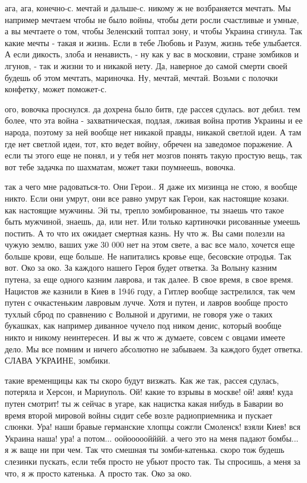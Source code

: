 ага, ага, конечно-с. мечтай и дальше-с. никому ж не возбраняется мечтать. Мы
например мечтаем чтобы не было войны, чтобы дети росли счастливые и умные, а вы
мечтаете о том, чтобы Зеленский топтал зону, и чтобы Украина сгинула. Так какие
мечты - такая и жизнь. Если в тебе Любовь и Разум, жизнь тебе улыбается. А если
дикость, злоба и ненависть, - ну как у вас в московии, стране зомбиков и
лгунов, - так и жизни то и никакой нету. Да, наверное до самой смерти своей
будешь об этом мечтать, мариночка. Ну, мечтай, мечтай. Возьми с полочки
конфетку, может поможет-с.

ого, вовочка проснулся. да дохрена было битв, где рассея сдулась. вот дебил.
тем более, что эта война - захватническая, подлая, лживая война против Украины
и ее народа, поэтому за ней вообще нет никакой правды, никакой светлой идеи. А
там где нет светлой идеи, тот, кто ведет войну, обречен на заведомое поражение.
А если ты этого еще не понял, и у тебя нет мозгов понять такую простую вещь,
так вот тебе задачка по шахматам, может таки поумнеешь, вовочка.

так а чего мне радоваться-то. Они Герои.. Я даже их мизинца не стою, я вообще
никто. Если они умрут, они все равно умрут как Герои, как настоящие козаки. как
настоящие мужчины. Эй ты, трепло зомбированное, ты знаешь что такое быть
мужчиной, знаешь, да, или нет. Или только картиночки рисованные умеешь постить.
А то что их ожидает смертная казнь. Ну что ж. Вы сами полезли на чужую землю,
ваших уже 30 000 нет на этом свете, а вас все мало, хочется еще больше крови,
еще больше. Не напитались кровье еще, бесовские отродья. Так вот. Око за око.
За каждого нашего Героя будет ответка. За Волыну казним путена, за еще одного
казним лаврова, и так далее. В свое время, в свое время. Нацистов же казнили в
Киев в 1946 году, а Гитлер вообще застрелился, так чем путен с очкастеньким
лавровым лучче. Хотя и путен, и лавров вообще просто тухлый сброд по сравнению
с Волыной и другими, не говоря уже о таких букашках, как например диванное
чучело под ником денис, который вообще никто и никому неинтересен. И вы ж что ж
думаете, совсем с овцами имеете дело. Мы все помним и ничего абсолютно не
забываем. За каждого будет ответка. СЛАВА УКРАИНЕ, зомбики.

такие временщицы как ты скоро будут визжать. Как же так, рассея сдулась,
потеряла и Херсон, и Мариуполь. Ой! какие то взрывы в москве! ой! аяяя! куда
путен смотрит! ты ж сейчас в угаре, как нацистка какая нибудь в Баварии во
время второй мировой войны сидит себе возле радиоприемника и пускает слюнки.
Ура! наши бравые германские хлопцы сожгли Смоленск! взяли Киев! вся Украина
наша! ура! а потом... оойооооойййй. а чего это на меня падают бомбы... я ж
ваще ни при чем. Так что смешная ты зомби-катенька. скоро тож будешь слезинки
пускать, если тебя просто не убьют просто так. Ты спросишь, а меня за что, я ж
просто катенька. А просто так. Око за око.

